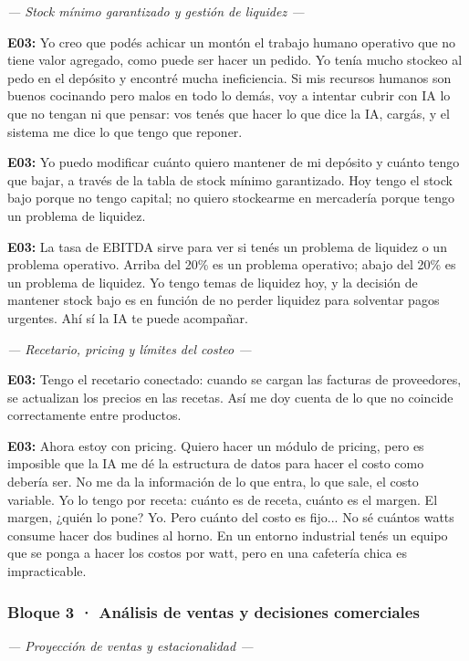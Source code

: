 \noindent\textit{--- Stock mínimo garantizado y gestión de liquidez ---}

\noindent\textbf{E03:} Yo creo que podés achicar un montón el trabajo humano operativo que no tiene valor agregado, como puede ser hacer un pedido. Yo tenía mucho stockeo al pedo en el depósito y encontré mucha ineficiencia. Si mis recursos humanos son buenos cocinando pero malos en todo lo demás, voy a intentar cubrir con IA lo que no tengan ni que pensar: vos tenés que hacer lo que dice la IA, cargás, y el sistema me dice lo que tengo que reponer.

\noindent\textbf{E03:} Yo puedo modificar cuánto quiero mantener de mi depósito y cuánto tengo que bajar, a través de la tabla de stock mínimo garantizado. Hoy tengo el stock bajo porque no tengo capital; no quiero stockearme en mercadería porque tengo un problema de liquidez.

\noindent\textbf{E03:} La tasa de EBITDA sirve para ver si tenés un problema de liquidez o un problema operativo. Arriba del 20\% es un problema operativo; abajo del 20\% es un problema de liquidez. Yo tengo temas de liquidez hoy, y la decisión de mantener stock bajo es en función de no perder liquidez para solventar pagos urgentes. Ahí sí la IA te puede acompañar.

\noindent\textit{--- Recetario, pricing y límites del costeo ---}

\noindent\textbf{E03:} Tengo el recetario conectado: cuando se cargan las facturas de proveedores, se actualizan los precios en las recetas. Así me doy cuenta de lo que no coincide correctamente entre productos.

\noindent\textbf{E03:} Ahora estoy con pricing. Quiero hacer un módulo de pricing, pero es imposible que la IA me dé la estructura de datos para hacer el costo como debería ser. No me da la información de lo que entra, lo que sale, el costo variable. Yo lo tengo por receta: cuánto es de receta, cuánto es el margen. El margen, ¿quién lo pone? Yo. Pero cuánto del costo es fijo... No sé cuántos watts consume hacer dos budines al horno. En un entorno industrial tenés un equipo que se ponga a hacer los costos por watt, pero en una cafetería chica es impracticable.

\subsubsection*{Bloque 3 · Análisis de ventas y decisiones comerciales}

\noindent\textit{--- Proyección de ventas y estacionalidad ---}

